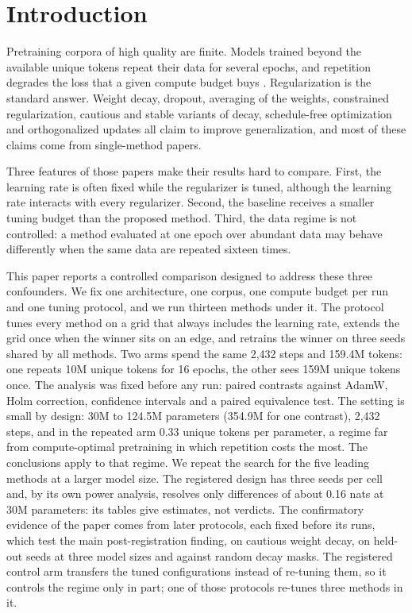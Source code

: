 \documentclass[twoside,11pt]{article}
\begin{document}
\section{Introduction}
\label{sec:intro}

Pretraining corpora of high quality are finite. Models trained beyond the available unique tokens repeat their data for several epochs, and repetition degrades the loss that a given compute budget buys \citep{muennighoff2023scaling}. Regularization is the standard answer. Weight decay, dropout, averaging of the weights, constrained regularization, cautious and stable variants of decay, schedule-free optimization and orthogonalized updates all claim to improve generalization, and most of these claims come from single-method papers.

Three features of those papers make their results hard to compare. First, the learning rate is often fixed while the regularizer is tuned, although the learning rate interacts with every regularizer. Second, the baseline receives a smaller tuning budget than the proposed method. Third, the data regime is not controlled: a method evaluated at one epoch over abundant data may behave differently when the same data are repeated sixteen times.

This paper reports a controlled comparison designed to address these three confounders. We fix one architecture, one corpus, one compute budget per run and one tuning protocol, and we run thirteen methods under it. The protocol tunes every method on a grid that always includes the learning rate, extends the grid once when the winner sits on an edge, and retrains the winner on three seeds shared by all methods. Two arms spend the same 2,432 steps and 159.4M tokens: one repeats 10M unique tokens for 16 epochs, the other sees 159M unique tokens once. The analysis was fixed before any run: paired contrasts against AdamW, Holm correction, confidence intervals and a paired equivalence test. The setting is small by design: 30M to 124.5M parameters (354.9M for one contrast), 2,432 steps, and in the repeated arm 0.33 unique tokens per parameter, a regime far from compute-optimal pretraining \citep{hoffmann2022training} in which repetition costs the most. The conclusions apply to that regime. We repeat the search for the five leading methods at a larger model size. The registered design has three seeds per cell and, by its own power analysis, resolves only differences of about 0.16 nats at 30M parameters: its tables give estimates, not verdicts. The confirmatory evidence of the paper comes from later protocols, each fixed before its runs, which test the main post-registration finding, on cautious weight decay, on held-out seeds at three model sizes and against random decay masks. The registered control arm transfers the tuned configurations instead of re-tuning them, so it controls the regime only in part; one of those protocols re-tunes three methods in it.
\end{document}
